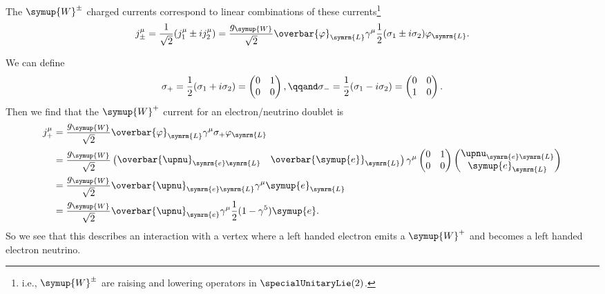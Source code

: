 \documentclass[fleqn]{NotesClass}
\newcommand{\Pparticle}[1]{\symup{#1}}
\newcommand{\Penominus}{\ensuremath{\Pparticle{e}}}
\newcommand{\PW}{\ensuremath{\Pparticle{W}}}
\newcommand{\PWpm}{\ensuremath{\Pparticle{W}^{\pm}}}
\newcommand{\PWp}{\ensuremath{\Pparticle{W}^{+}}}
\newcommand{\diracadjoint}[1]{\overbar{#1}}
\newcommand{\Left}{\symrm{L}}
\begin{document}
    The \(\PWpm\) charged currents correspond to linear combinations of these currents\footnote{i.e., \(\PWpm\) are raising and lowering operators in \(\specialUnitaryLie(2)\).}
    \begin{equation}
        j_{\pm}^\mu = \frac{1}{\sqrt{2}} (j_1^\mu \pm i j_2^\mu) = \frac{g_{\PW}}{\sqrt{2}} \diracadjoint{\varphi}_{\Left} \gamma^\mu \frac{1}{2}(\sigma_1 \pm i \sigma_2) \varphi_{\Left}.
    \end{equation}
    
    We can define
    \begin{equation}
        \sigma_+ = \frac{1}{2}(\sigma_1 + i\sigma_2) = 
        \begin{pmatrix}
            0 & 1\\
            0 & 0
        \end{pmatrix}
        , \qqand \sigma_- = \frac{1}{2}(\sigma_1 - i\sigma_2) = 
        \begin{pmatrix}
            0 & 0\\
            1 & 0
        \end{pmatrix}
        .
    \end{equation}
    Then we find that the \(\PWp\) current for an electron/neutrino doublet is
    \begin{align}
        j_+^\mu &= \frac{g_{\PW}}{\sqrt{2}} \diracadjoint{\varphi}_{\Left} \gamma^\mu \sigma_+ \varphi_{\Left}\\
        &= \frac{g_{\PW}}{\sqrt{2}}
        \begin{pmatrix}
            \diracadjoint{\upnu}_{\symrm{e}\Left} & \diracadjoint{\Penominus}_{\Left}
        \end{pmatrix}
        \gamma^\mu 
        \begin{pmatrix}
            0 & 1\\
            0 & 0
        \end{pmatrix}
        \begin{pmatrix}
            \upnu_{\symrm{e}\Left}\\
            \Penominus_{\Left}
        \end{pmatrix}
        \\
        &= \frac{g_{\PW}}{\sqrt{2}} \diracadjoint{\upnu}_{\symrm{e}\Left} \gamma^\mu \Penominus_{\Left}\\
        &= \frac{g_{\PW}}{\sqrt{2}} \diracadjoint{\upnu}_{\symrm{e}} \gamma^\mu\frac{1}{2} (1 - \gamma^5) \Penominus.
    \end{align}
    So we see that this describes an interaction with a vertex where a left handed electron emits a \(\PWp\) and becomes a left handed electron neutrino.
    
\end{document}
